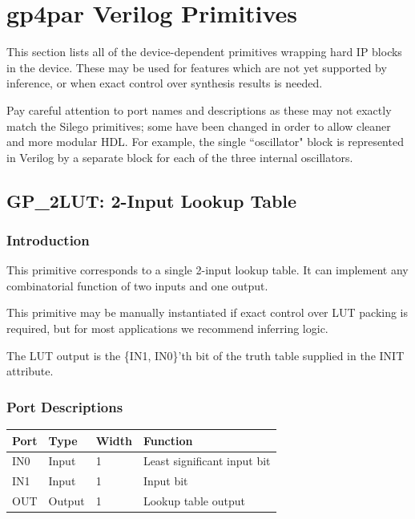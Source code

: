 \documentclass[11pt]{article}
\begin{document}
\pagebreak
\section{gp4par Verilog Primitives}

This section lists all of the device-dependent primitives wrapping hard IP blocks in the device. These may be used for 
features which are not yet supported by inference, or when exact control over synthesis results is needed.

Pay careful attention to port names and descriptions as these may not exactly match the Silego primitives; some have 
been changed in order to allow cleaner and more modular HDL. For example, the single ``oscillator" block is represented 
in Verilog by a separate block for each of the three internal oscillators.


\pagebreak
\subsection{GP\_2LUT: 2-Input Lookup Table}

\subsubsection{Introduction}
This primitive corresponds to a single 2-input lookup table. It can implement any combinatorial function of two 
inputs and one output.

This primitive may be manually instantiated if exact control over LUT packing is required, but for most applications we 
recommend inferring logic.

The LUT output is the \{IN1, IN0\}'th bit of the truth table supplied in the INIT attribute.

\subsubsection{Port Descriptions}

\begin{tabularx}{4in}{|l|l|l|X|}
\hline
{\bfseries Port} & {\bfseries Type} & {\bfseries Width} & {\bfseries Function} \\
\hline
IN0 & Input & 1 & Least significant input bit \\
\hline
IN1 & Input & 1 & Input bit \\
\hline
OUT & Output & 1 & Lookup table output \\
\hline
\end{tabularx}
\end{document}
